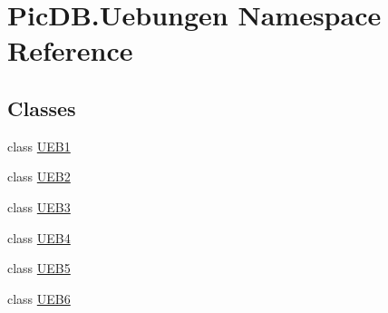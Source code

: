 \hypertarget{namespace_pic_d_b_1_1_uebungen}{}\section{Pic\+D\+B.\+Uebungen Namespace Reference}
\label{namespace_pic_d_b_1_1_uebungen}
\subsection*{Classes}
\begin{DoxyCompactItemize}
\item 
class \mbox{\hyperlink{class_pic_d_b_1_1_uebungen_1_1_u_e_b1}{U\+E\+B1}}
\item 
class \mbox{\hyperlink{class_pic_d_b_1_1_uebungen_1_1_u_e_b2}{U\+E\+B2}}
\item 
class \mbox{\hyperlink{class_pic_d_b_1_1_uebungen_1_1_u_e_b3}{U\+E\+B3}}
\item 
class \mbox{\hyperlink{class_pic_d_b_1_1_uebungen_1_1_u_e_b4}{U\+E\+B4}}
\item 
class \mbox{\hyperlink{class_pic_d_b_1_1_uebungen_1_1_u_e_b5}{U\+E\+B5}}
\item 
class \mbox{\hyperlink{class_pic_d_b_1_1_uebungen_1_1_u_e_b6}{U\+E\+B6}}
\end{DoxyCompactItemize}
